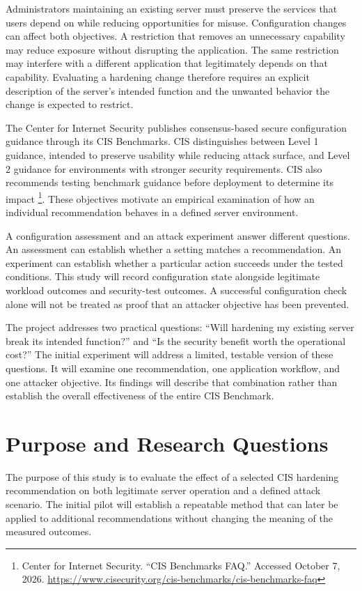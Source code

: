 \documentclass[12pt,letterpaper]{article}
\begin{document}
Administrators maintaining an existing server must preserve the services that users depend on while reducing opportunities for misuse. Configuration changes can affect both objectives. A restriction that removes an unnecessary capability may reduce exposure without disrupting the application. The same restriction may interfere with a different application that legitimately depends on that capability. Evaluating a hardening change therefore requires an explicit description of the server's intended function and the unwanted behavior the change is expected to restrict.

The Center for Internet Security publishes consensus-based secure configuration guidance through its CIS Benchmarks. CIS distinguishes between Level 1 guidance, intended to preserve usability while reducing attack surface, and Level 2 guidance for environments with stronger security requirements. CIS also recommends testing benchmark guidance before deployment to determine its impact \footnote{Center for Internet Security. ``CIS Benchmarks FAQ.''  Accessed October 7, 2026. \url{https://www.cisecurity.org/cis-benchmarks/cis-benchmarks-faq}}. These objectives motivate an empirical examination of how an individual recommendation behaves in a defined server environment.

A configuration assessment and an attack experiment answer different questions. An assessment can establish whether a setting matches a recommendation. An experiment can establish whether a particular action succeeds under the tested conditions. This study will record configuration state alongside legitimate workload outcomes and security-test outcomes. A successful configuration check alone will not be treated as proof that an attacker objective has been prevented.

The project addresses two practical questions: ``Will hardening my existing server break its intended function?'' and ``Is the security benefit worth the operational cost?'' The initial experiment will address a limited, testable version of these questions. It will examine one recommendation, one application workflow, and one attacker objective. Its findings will describe that combination rather than establish the overall effectiveness of the entire CIS Benchmark.
\section{Purpose and Research Questions}
\label{sec:orgd54981c}

The purpose of this study is to evaluate the effect of a selected CIS hardening recommendation on both legitimate server operation and a defined attack scenario. The initial pilot will establish a repeatable method that can later be applied to additional recommendations without changing the meaning of the measured outcomes.
\end{document}
